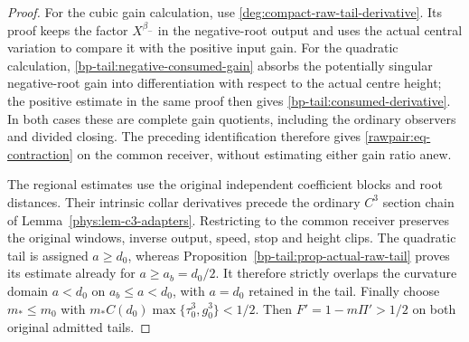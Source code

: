 \begin{proof}
For the cubic gain calculation, use
\eqref{deg:compact-raw-tail-derivative}. Its proof keeps the factor
\(X^{\beta_-}\) in the negative-root output and uses the actual
central variation to compare it with the positive input gain. For the
quadratic calculation, \eqref{bp-tail:negative-consumed-gain} absorbs
the potentially singular negative-root gain into differentiation with
respect to the actual centre height; the positive estimate in the same
proof then gives \eqref{bp-tail:consumed-derivative}. In both cases
these are complete gain quotients, including the ordinary observers
and divided closing. The preceding identification therefore gives
\eqref{rawpair:eq-contraction} on the common receiver, without
estimating either gain ratio anew.

The regional estimates use the original independent coefficient blocks
and root distances. Their intrinsic collar derivatives precede the
ordinary \(C^3\) section chain of
Lemma~\ref{phys:lem-c3-adapters}. Restricting to the common receiver
preserves the original windows, inverse output, speed, stop and height
clips. The quadratic tail is assigned \(a\ge d_0\), whereas
Proposition~\ref{bp-tail:prop-actual-raw-tail} proves its estimate already
for \(a\ge a_b=d_0/2\). It therefore strictly overlaps the curvature
domain \(a<d_0\) on \(a_b\le a<d_0\), with \(a=d_0\) retained in the tail.
Finally choose \(m_*\le m_0\) with
\(m_*C(d_0)\max\{\tau_0^3,g_0^3\}<1/2\).
Then \(F'=1-m\Pi'>1/2\) on both original admitted tails.
\end{proof}

